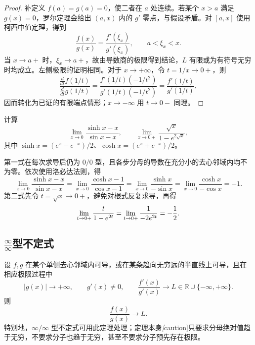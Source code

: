 \documentclass[UTF8,12pt,a4paper,fontset=fandol]{ctexbook}
\begin{document}
\begin{proof}
补定义 $f(a)=g(a)=0$，使二者在 $a$ 处连续。若某个 $x>a$ 满足 $g(x)=0$，罗尔定理会给出 $(a,x)$ 内的 $g'$ 零点，与假设矛盾。对 $[a,x]$ 使用柯西中值定理，得到
\[
    \frac{f(x)}{g(x)}=\frac{f'(\xi_x)}{g'(\xi_x)},
    \qquad a<\xi_x<x.
\]
当 $x\to a+$ 时，$\xi_x\to a+$，故由导数商的极限得到结论，$L$ 有限或为有符号无穷时均成立。左侧极限的证明相同。对于 $x\to+\infty$，令 $t=1/x\to0+$，则
\[
    \frac{\frac{d}{dt}f(1/t)}{\frac{d}{dt}g(1/t)}
    =\frac{f'(1/t)(-1/t^2)}{g'(1/t)(-1/t^2)}
    =\frac{f'(1/t)}{g'(1/t)},
\]
因而转化为已证的有限端点情形；$x\to-\infty$ 用 $t\to0-$ 同理。
\end{proof}

\begin{example}
\label{ex:lhopital-zero-over-zero-calculations}
计算
\[
    \lim_{x\to0}\frac{\sinh x-x}{\sin x-x},
    \qquad
    \lim_{x\to0+}\frac{\sqrt{x}}{1-e^{2\sqrt{x}}},
\]
其中 $\sinh x=(e^x-e^{-x})/2$、$\cosh x=(e^x+e^{-x})/2$。
\end{example}

\begin{solve}
第一式在每次求导后仍为 $0/0$ 型，且各步分母的导数在充分小的去心邻域内均不为零。依次使用洛必达法则，得
\[
    \lim_{x\to0}\frac{\sinh x-x}{\sin x-x}
    =\lim_{x\to0}\frac{\cosh x-1}{\cos x-1}
    =\lim_{x\to0}\frac{\sinh x}{-\sin x}
    =\lim_{x\to0}\frac{\cosh x}{-\cos x}=-1.
\]
第二式先令 $t=\sqrt{x}\to0+$，避免对根式反复求导，再得
\[
    \lim_{t\to0+}\frac{t}{1-e^{2t}}
    =\lim_{t\to0+}\frac1{-2e^{2t}}=-\frac12.
    \qedhere
\]
\end{solve}

\subsection{\texorpdfstring{$\frac{\infty}{\infty}$}{infinity/infinity}型不定式}
\label{subsec:infinity-over-infinity-indeterminate-form}

\begin{theorem}[分母无界时的洛必达法则]
\label{thm:lhopital-infinite-denominator}
设 $f,g$ 在某个单侧去心邻域内可导，或在某条趋向无穷远的半直线上可导，且在相应极限过程中
\[
    |g(x)|\to+\infty,\qquad g'(x)\neq0,
    \qquad \frac{f'(x)}{g'(x)}\to L
    \in\mathbb{R}\cup\{-\infty,+\infty\}.
\]
则
\begin{equation}
    \frac{f(x)}{g(x)}\to L.
    \label{eq:lhopital-infinite-denominator}
\end{equation}
特别地，$\infty/\infty$ 型不定式可用此定理处理；定理本身\emph[caution]{只要求分母绝对值趋于无穷，不要求分子也趋于无穷，甚至不要求分子预先存在极限}。
\end{theorem}
\end{document}
